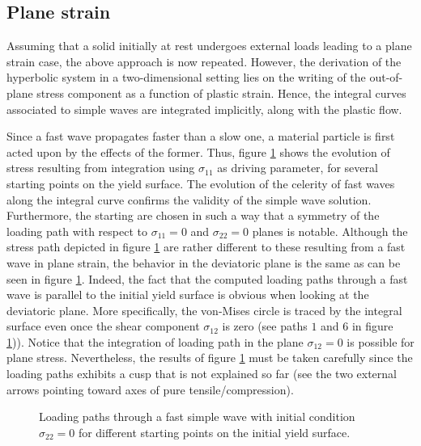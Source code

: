 \newpage
\subsection{Plane strain}
Assuming that a solid initially at rest undergoes external loads leading to a plane strain case, the above approach is now repeated.
However, the derivation of the hyperbolic system in a two-dimensional setting lies on the writing of the out-of-plane stress component as a function of plastic strain.
Hence, the integral curves associated to simple waves are integrated implicitly, along with the plastic flow.

Since a fast wave propagates faster than a slow one, a material particle is first acted upon by the effects of the former. 
Thus, figure \ref{fig:fast_path_plane_strains} shows the evolution of stress resulting from integration using $\sigma_{11}$ as driving parameter, for several starting points on the yield surface.
The evolution of the celerity of fast waves along the integral curve confirms the validity of the simple wave solution.
Furthermore, the starting are chosen in such a way that a symmetry of the loading path with respect to $\sigma_{11}=0$ and $\sigma_{22}=0$ planes is notable.
Although the stress path depicted in figure \ref{fig:fast_path_plane_strains} are rather different to these resulting from a fast wave in plane strain, the behavior in the deviatoric plane is the same as can be seen in figure \ref{fig:fast_path_plane_strains}. 
Indeed, the fact that the computed loading paths through a fast wave is parallel to the initial yield surface is obvious when looking at the deviatoric plane.
More specifically, the von-Mises circle is traced by the integral surface even once the shear component $\sigma_{12}$ is zero (see paths $1$ and $6$ in figure \ref{fig:fast_path_plane_strains})).
Notice that the integration of loading path in the plane $\sigma_{12}=0$ is possible for plane stress.
Nevertheless, the results of figure \ref{fig:fast_path_plane_strains} must be taken carefully since the loading paths exhibits a cusp that is not explained so far (see the two external arrows pointing toward axes of pure tensile/compression).

\begin{figure}[h!]
  \centering
  \caption{Loading paths through a fast simple wave with initial condition $\sigma_{22}=0$ for different starting points on the initial yield surface.}
  \label{fig:fast_path_plane_strains}
\end{figure}

